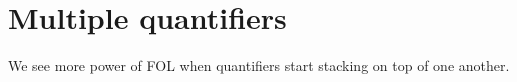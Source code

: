 

\chapter{Multiple quantifiers}\label{s:MultipleGenerality}



We see more power of FOL when quantifiers start stacking on top of one another. 

